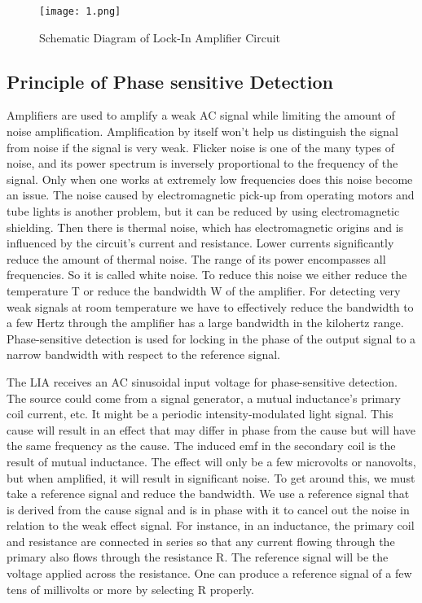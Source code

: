 	
		\begin{figure}[H]
			\centering
			\texttt{[image: 1.png]}
			\caption{Schematic Diagram of Lock-In Amplifier Circuit}
			\label{fig:1}
		\end{figure}
	
	\subsection{Principle of Phase sensitive Detection}

		Amplifiers are used to amplify a weak AC signal while limiting the amount of noise amplification. Amplification by itself won't help us distinguish the signal from noise if the signal is very weak. Flicker noise is one of the many types of noise, and its power spectrum is inversely proportional to the frequency of the signal. Only when one works at extremely low frequencies does this noise become an issue. The noise caused by electromagnetic pick-up from operating motors and tube lights is another problem, but it can be reduced by using electromagnetic shielding. Then there is thermal noise, which has electromagnetic origins and is influenced by the circuit's current and resistance. Lower currents significantly reduce the amount of thermal noise. The range of its power encompasses all frequencies. So it is called white noise. To reduce this noise we either reduce the temperature T or reduce the bandwidth W of the amplifier. For detecting very weak signals at room temperature we have to effectively reduce the bandwidth to a few Hertz through the amplifier has a large bandwidth in the kilohertz range. Phase-sensitive detection is used for locking in the phase of the output signal to a narrow bandwidth with respect to the reference signal.

		The LIA receives an AC sinusoidal input voltage for phase-sensitive detection. The source could come from a signal generator, a mutual inductance's primary coil current, etc. It might be a periodic intensity-modulated light signal. This cause will result in an effect that may differ in phase from the cause but will have the same frequency as the cause. The induced emf in the secondary coil is the result of mutual inductance. The effect will only be a few microvolts or nanovolts, but when amplified, it will result in significant noise. To get around this, we must take a reference signal and reduce the bandwidth. We use a reference signal that is derived from the cause signal and is in phase with it to cancel out the noise in relation to the weak effect signal. For instance, in an inductance, the primary coil and resistance are connected in series so that any current flowing through the primary also flows through the resistance R. The reference signal will be the voltage applied across the resistance. One can produce a reference signal of a few tens of millivolts or more by selecting R properly.

